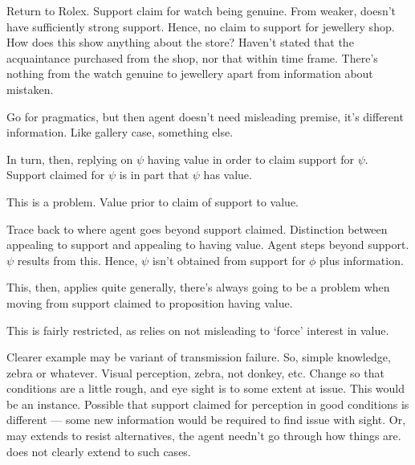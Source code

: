 \begin{note}
  Return to Rolex.
  Support claim for watch being genuine.
  From weaker,  doesn't have sufficiently strong support.
  Hence, no claim to support for jewellery shop.
  How does this show anything about the store?
  Haven't stated that the acquaintance purchased from the shop, nor that within time frame.
  There's nothing from the watch genuine to jewellery apart from information about mistaken.

  Go for pragmatics, but then agent doesn't need misleading premise, it's different information.
  Like gallery case, something else.

  In turn, then, replying on \(\psi\) having value in order to claim support for \(\psi\).
  Support claimed for \(\psi\) is in part that \(\psi\) has value.

  This is a problem.
  Value prior to claim of support to value.

  Trace back to where agent goes beyond support claimed.
  Distinction between appealing to support and appealing to having value.
  Agent steps beyond support.
  \(\psi\) results from this.
  Hence, \(\psi\) isn't obtained from support for \(\phi\) plus information.

  This, then, applies quite generally, there's always going to be a problem when moving from support claimed to proposition having value.

  This is fairly restricted, as relies on not misleading to `force' interest in value.

  Clearer example may be variant of transmission failure.
  So, simple knowledge, zebra or whatever.
  Visual perception, zebra, not donkey, etc.
  Change so that conditions are a little rough, and eye sight is to some extent at issue.
  This would be an instance.
  Possible that support claimed for perception in good conditions is different --- some new information would be required to find issue with sight.
  Or, may extends to resist alternatives, the agent needn't go through how things are.
  \nI{} does not clearly extend to such cases.
\end{note}


\newpage


